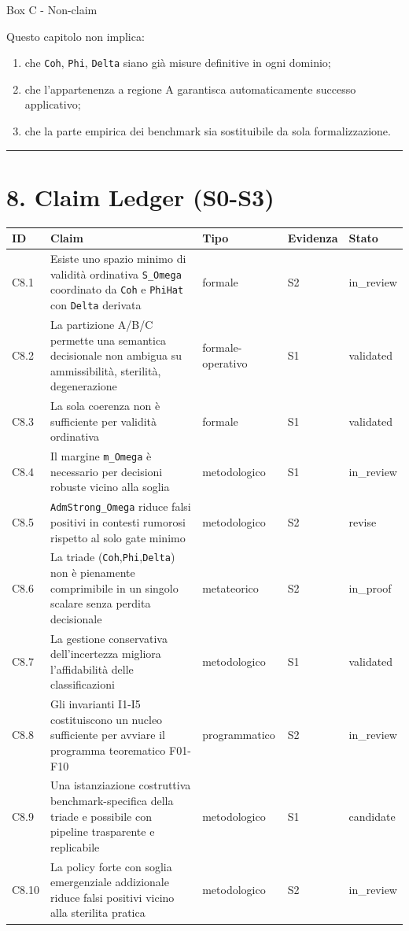 Box C - Non-claim

Questo capitolo non implica:

\begin{enumerate}
\def\labelenumi{\arabic{enumi}.}
\tightlist
\item
  che \texttt{Coh}, \texttt{Phi}, \texttt{Delta} siano già misure definitive in ogni dominio;
\item
  che l'appartenenza a regione A garantisca automaticamente successo applicativo;
\item
  che la parte empirica dei benchmark sia sostituibile da sola formalizzazione.
\end{enumerate}

\begin{center}\rule{0.5\linewidth}{0.5pt}\end{center}

\section{8. Claim Ledger (S0-S3)}

{\def\LTcaptype{none} %
\begin{longtable}[]{@{}lllll@{}}
\toprule\noalign{}
ID & Claim & Tipo & Evidenza & Stato \\
\midrule\noalign{}
\endhead
\bottomrule\noalign{}
\endlastfoot
C8.1 & Esiste uno spazio minimo di validità ordinativa \texttt{S\_Omega} coordinato da \texttt{Coh} e \texttt{PhiHat} con \texttt{Delta} derivata & formale & S2 & in\_review \\
C8.2 & La partizione A/B/C permette una semantica decisionale non ambigua su ammissibilità, sterilità, degenerazione & formale-operativo & S1 & validated \\
C8.3 & La sola coerenza non è sufficiente per validità ordinativa & formale & S1 & validated \\
C8.4 & Il margine \texttt{m\_Omega} è necessario per decisioni robuste vicino alla soglia & metodologico & S1 & in\_review \\
C8.5 & \texttt{AdmStrong\_Omega} riduce falsi positivi in contesti rumorosi rispetto al solo gate minimo & metodologico & S2 & revise \\
C8.6 & La triade (\texttt{Coh},\texttt{Phi},\texttt{Delta}) non è pienamente comprimibile in un singolo scalare senza perdita decisionale & metateorico & S2 & in\_proof \\
C8.7 & La gestione conservativa dell'incertezza migliora l'affidabilità delle classificazioni & metodologico & S1 & validated \\
C8.8 & Gli invarianti I1-I5 costituiscono un nucleo sufficiente per avviare il programma teorematico F01-F10 & programmatico & S2 & in\_review \\
C8.9 & Una istanziazione costruttiva benchmark-specifica della triade e possibile con pipeline trasparente e replicabile & metodologico & S1 & candidate \\
C8.10 & La policy forte con soglia emergenziale addizionale riduce falsi positivi vicino alla sterilita pratica & metodologico & S2 & in\_review \\
\end{longtable}
}

